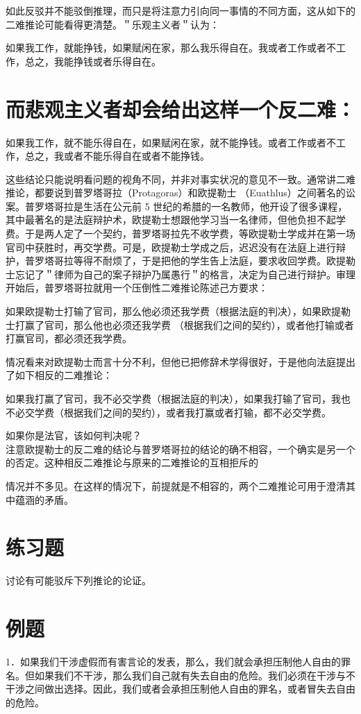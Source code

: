 如此反驳并不能驳倒推理，而只是将注意力引向同一事情的不同方面，这从如下的二难推论可能看得更清楚。＂乐观主义者＂认为：

如果我工作，就能挣钱，如果赋闲在家，那么我乐得自在。我或者工作或者不工作，总之，我能挣钱或者乐得自在。

\section*{而悲观主义者却会给出这样一个反二难：}
如果我工作，就不能乐得自在，如果赋闲在家，就不能挣钱。或者工作或者不工作，总之，我或者不能乐得自在或者不能挣钱。

这些结论只能说明看问题的视角不同，并非对事实状况的意见不一致。通常讲二难推论，都要说到普罗塔哥拉（Protagoras）和欧提勒士 （Euathlus）之间著名的讼案。普罗塔哥拉是生活在公元前 5 世纪的希腊的一名教师，他开设了很多课程，其中最著名的是法庭辩护术，欧提勒士想跟他学习当一名律师，但他负担不起学费。于是两人定了一个契约，普罗塔哥拉先不收学费，等欧提勒士学成并在第一场官司中获胜时，再交学费。可是，欧提勒士学成之后，迟迟没有在法庭上进行辩护，普罗塔哥拉等得不耐烦了，于是把他的学生告上法庭，要求收回学费。欧提勒士忘记了＂律师为自己的案子辩护乃属愚行＂的格言，决定为自己进行辩护。审理开始后，普罗塔哥拉就用一个压倒性二难推论陈述己方要求：

如果欧提勒士打输了官司，那么他必须还我学费（根据法庭的判决），如果欧提勒士打赢了官司，那么他也必须还我学费 （根据我们之间的契约），或者他打输或者打赢官司，都必须还我学费。

情况看来对欧提勒士而言十分不利，但他已把修辞术学得很好，于是他向法庭提出了如下相反的二难推论：

如果我打赢了官司，我不必交学费（根据法庭的判决），如果我打输了官司，我也不必交学费（根据我们之间的契约），或者我打赢或者打输，都不必交学费。

如果你是法官，该如何判决呢？\\
注意欧提勒士的反二难的结论与普罗塔哥拉的结论的确不相容，一个确实是另一个的否定。这种相反二难推论与原来的二难推论的互相拒斥的

情况并不多见。在这样的情况下，前提就是不相容的，两个二难推论可用于澄清其中蕴涵的矛盾。

\section*{练习题}
讨论有可能驳斥下列推论的论证。

\section*{例题}
1．如果我们干涉虚假而有害言论的发表，那么，我们就会承担压制他人自由的罪名。但如果我们不干涉，那么我们自己就有失去自由的危险。我们必须在干涉与不干涉之间做出选择。因此，我们或者会承担压制他人自由的罪名，或者冒失去自由的危险。

